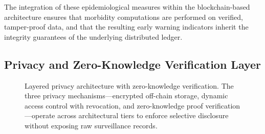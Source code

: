 \documentclass[AMA,LATO1COL]{WileyNJD-v2}
\begin{document}
The integration of these epidemiological measures within the blockchain-based architecture ensures that morbidity computations are performed on verified, tamper-proof data, and that the resulting early warning indicators inherit the integrity guarantees of the underlying distributed ledger.

\subsection{Privacy and Zero-Knowledge Verification Layer}\label{subsec:privacy}

\begin{figure}[!ht]
\centering
{}
\caption{Layered privacy architecture with zero-knowledge verification. The three privacy mechanisms---encrypted off-chain storage, dynamic access control with revocation, and zero-knowledge proof verification---operate across architectural tiers to enforce selective disclosure without exposing raw surveillance records.}\label{fig:privacy}
\end{figure}
%
%
%
\end{document}
